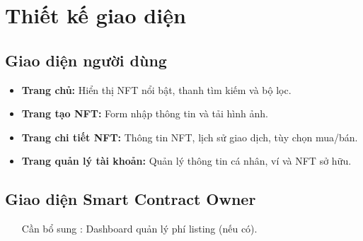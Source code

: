 \section{Thiết kế giao diện}

\subsection{Giao diện người dùng}
\begin{itemize}
    \item \textbf{Trang chủ:} Hiển thị NFT nổi bật, thanh tìm kiếm và bộ lọc.
    \item \textbf{Trang tạo NFT:} Form nhập thông tin và tải hình ảnh.
    \item \textbf{Trang chi tiết NFT:} Thông tin NFT, lịch sử giao dịch, tùy chọn mua/bán.
    \item \textbf{Trang quản lý tài khoản:} Quản lý thông tin cá nhân, ví và NFT sở hữu.
\end{itemize}

\subsection{Giao diện Smart Contract Owner}
\begin{itemize}
    \item [Cần bổ sung]: Dashboard quản lý phí listing (nếu có).
\end{itemize} 